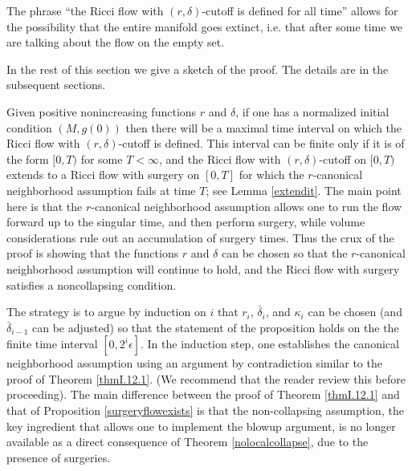 \documentclass[12pt]{amsart}
\newcommand{\de}{\delta}
\newcommand{\eps}{\epsilon}
\numberwithin{equation}{section}
\theoremstyle{plain}
\theoremstyle{definition}
\theoremstyle{remark}
\begin{document}
The phrase ``the Ricci flow with $(r,\de)$-cutoff
is defined for all time'' allows for the possibility that the entire
manifold goes extinct, i.e. that after some time we are talking
about the flow on the empty set.

In the rest of this section we give a sketch of the proof.  The details
are in the subsequent sections.

Given positive nonincreasing functions $r$ and $\de$,
if one has a normalized initial condition $(M,g(0))$ then there
will be a maximal time interval on which the Ricci flow with 
$(r,\de)$-cutoff is defined.   This interval can be finite
only if it is of the form $[0,T)$ for some $T<\infty$, and the 
Ricci flow with $(r,\de)$-cutoff on $[0,T)$ extends to a Ricci flow with surgery
on $[0,T]$ for which the $r$-canonical neighborhood
assumption fails at time $T$; see Lemma \ref{extendit}. The main point
here is that the $r$-canonical neighborhood assumption
allows one to run the flow forward up to the singular time, and then perform
surgery, while volume considerations rule out an accumulation of 
surgery times.   Thus the crux of the proof is showing that the 
functions $r$
and $\de$ can be chosen so that the $r$-canonical neighborhood assumption
will continue to hold, and the Ricci flow with surgery 
satisfies a noncollapsing
condition.

The strategy is to  argue
by induction on $i$ that $r_i$, $\bar\de_i$, and $\kappa_i$
can be chosen (and $\bar\de_{i-1}$ can be adjusted)
so that the statement of the proposition holds on the
the finite time interval $[0,2^i\eps]$.  
In the induction step, one establishes the canonical
neighborhood assumption using an argument by contradiction similar
to the proof of Theorem \ref{thmI.12.1}. (We recommend that the reader review this
before proceeding).   The main difference between the proof of
Theorem \ref{thmI.12.1} and that of Proposition \ref{surgeryflowexists} is that the 
non-collapsing assumption, the key ingredient
that allows one to implement the blowup
argument, is no longer available as a direct consequence of Theorem \ref{nolocalcollapse}, 
due to the presence of surgeries.   
\end{document}
